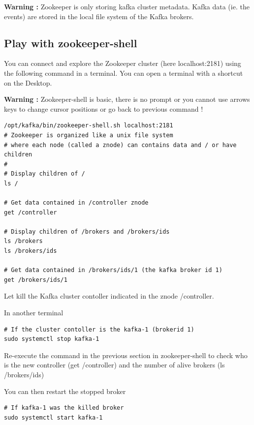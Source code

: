 \documentclass{article}
\newenvironment{warning}
    { \begin{mdframed}[backgroundcolor=blue!20] \textbf{Warning : } }
    {  \end{mdframed}}
\newenvironment{code}
    { \begin{mdframed} }    {  \end{mdframed}}
\begin{document}
\begin{warning}
Zookeeper is only storing kafka cluster metadata. Kafka data (ie. the events) are stored in the local file system of the Kafka brokers.
\end{warning}

\subsection{Play with zookeeper-shell}

You can connect and explore the Zookeeper cluster (here localhost:2181) using the following command in a terminal. You can open a terminal with a shortcut on the Desktop.
\begin{warning}
Zookeeper-shell is basic, there is no prompt or you cannot use arrows keys to change cursor positions or go back to previous command !
\end{warning}
\begin{code}
    \begin{verbatim}
/opt/kafka/bin/zookeeper-shell.sh localhost:2181
# Zookeeper is organized like a unix file system 
# where each node (called a znode) can contains data and / or have children
# 
# Display children of /
ls / 

# Get data contained in /controller znode
get /controller

# Display children of /brokers and /brokers/ids
ls /brokers
ls /brokers/ids

# Get data contained in /brokers/ids/1 (the kafka broker id 1)
get /brokers/ids/1
    \end{verbatim}
\end{code}

Let kill the Kafka cluster contoller indicated in the znode /controller.


In another terminal

\begin{code}
    \begin{verbatim}
# If the cluster contoller is the kafka-1 (brokerid 1)
sudo systemctl stop kafka-1
    \end{verbatim}
\end{code}

Re-execute the command in the previous section in zookeeper-shell to check who is the new controller (get /controller) and the number of alive brokers (ls /brokers/ids)

You can then restart the stopped broker

\begin{code}
    \begin{verbatim}
# If kafka-1 was the killed broker
sudo systemctl start kafka-1
    \end{verbatim}
\end{code}
\end{document}
